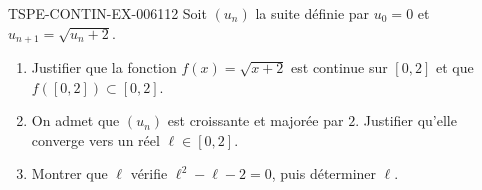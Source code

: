 \begin{exercice}{TSPE-CONTIN-EX-006}{1}{12}
Soit $(u_n)$ la suite définie par $u_0 = 0$ et $u_{n+1} = \sqrt{u_n + 2}$.
\begin{enumerate}
  \item Justifier que la fonction $f(x) = \sqrt{x+2}$ est continue sur $[0, 2]$ et que $f([0,2]) \subset [0,2]$.
  \item On admet que $(u_n)$ est croissante et majorée par $2$. Justifier qu'elle converge vers un réel $\ell \in [0, 2]$.
  \item Montrer que $\ell$ vérifie $\ell^2 - \ell - 2 = 0$, puis déterminer $\ell$.
\end{enumerate}
\end{exercice}
